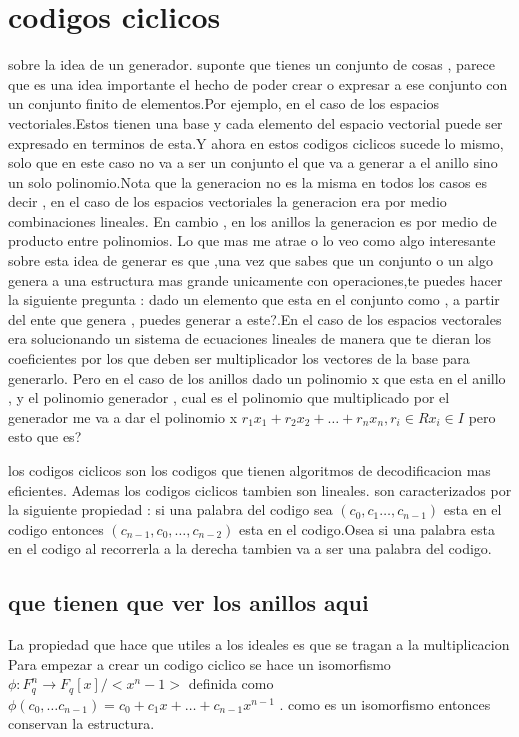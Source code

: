 \documentclass[12p]{article}
\begin{document}
\section{codigos ciclicos}
sobre la idea de un generador.
suponte que tienes un conjunto de cosas , parece que es una idea importante el hecho de poder crear o expresar a ese conjunto
con un conjunto finito de elementos.Por ejemplo, en el caso de los espacios vectoriales.Estos tienen una base y cada elemento del
espacio vectorial puede ser expresado en terminos de esta.Y ahora en estos codigos ciclicos sucede lo mismo, solo que en este caso
no va a ser un conjunto el que va a generar a el anillo sino un solo polinomio.Nota que la generacion no es la misma en todos los casos
es decir , en el caso de los espacios vectoriales la generacion era por medio combinaciones lineales. En cambio , en los anillos
la generacion es por medio de producto entre polinomios.
Lo que mas me atrae o lo veo como algo interesante sobre esta idea de generar es que ,una vez que sabes que un conjunto o un algo genera
a una estructura mas grande unicamente con operaciones,te puedes hacer la siguiente pregunta : dado un elemento que esta en el conjunto
como , a partir del ente que genera , puedes generar a este?.En el caso de los espacios vectorales era solucionando un sistema de ecuaciones
lineales de manera que te dieran los coeficientes por los que deben ser multiplicador los vectores de la base para generarlo. Pero en el caso
de los anillos dado un polinomio x que esta en el anillo , y el polinomio generador , cual es el polinomio que multiplicado por el generador
me va a dar el polinomio x
$r_1 x_1 + r_2x_2 + \dots + r_n x_n ,r_i \in R x_i \in I $ pero esto que es? 

los codigos ciclicos son los codigos que tienen algoritmos de decodificacion mas eficientes.
Ademas los codigos ciclicos tambien son lineales.
son caracterizados por la siguiente propiedad : si una palabra del codigo sea $(c_0,c_1 \dots , c_{n-1})$ esta en el codigo
entonces $(c_{n-1},c_0,\dots ,c_{n-2})$ esta en el codigo.Osea si una palabra esta en el codigo al recorrerla a la derecha tambien va a
ser una palabra del codigo.
\subsection{que tienen que ver los anillos aqui}
La propiedad que hace que utiles a los ideales es que se tragan a la multiplicacion
Para empezar a crear un codigo ciclico se hace un isomorfismo $\phi : F _ q ^ n \rightarrow F_q [x] / <x^n - 1>$ definida como
$\phi(c_0,\dots c_{n-1}) = c_0 + c_1 x + \dots + c _ {n-1} x ^ {n-1}$ . como es un isomorfismo entonces conservan la estructura.
\end{document}
